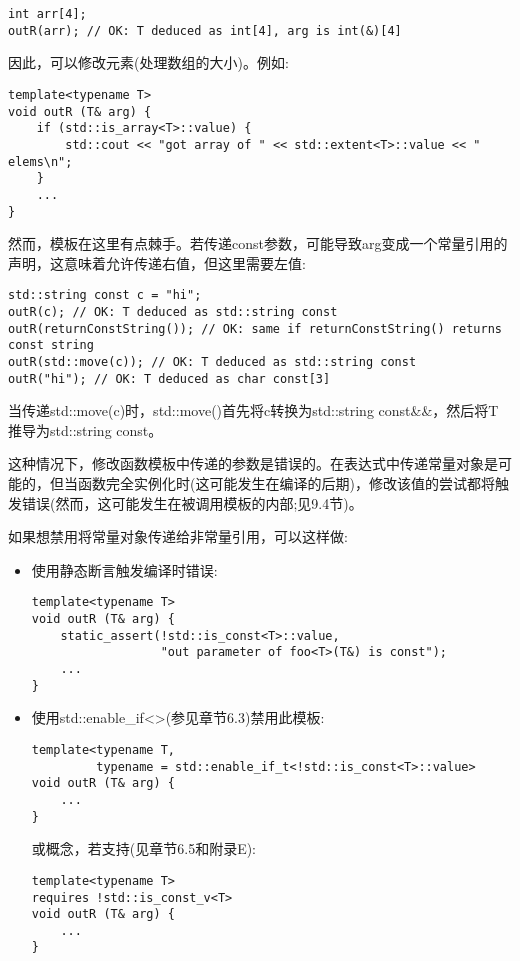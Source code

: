 \begin{lstlisting}[style=styleCXX]
int arr[4];
outR(arr); // OK: T deduced as int[4], arg is int(&)[4]
\end{lstlisting}

因此，可以修改元素(处理数组的大小)。例如:

\begin{lstlisting}[style=styleCXX]
template<typename T>
void outR (T& arg) {
	if (std::is_array<T>::value) {
		std::cout << "got array of " << std::extent<T>::value << " elems\n";
	}
	...
}
\end{lstlisting}

然而，模板在这里有点棘手。若传递const参数，可能导致arg变成一个常量引用的声明，这意味着允许传递右值，但这里需要左值:

\begin{lstlisting}[style=styleCXX]
std::string const c = "hi";
outR(c); // OK: T deduced as std::string const
outR(returnConstString()); // OK: same if returnConstString() returns const string
outR(std::move(c)); // OK: T deduced as std::string const
outR("hi"); // OK: T deduced as char const[3]
\end{lstlisting}

\begin{tcolorbox}[colback=webgreen!5!white,colframe=webgreen!75!black]
\hspace*{0.75cm}当传递std::move(c)时，std::move()首先将c转换为std::string const\&\&，然后将T推导为std::string const。
\end{tcolorbox}

这种情况下，修改函数模板中传递的参数是错误的。在表达式中传递常量对象是可能的，但当函数完全实例化时(这可能发生在编译的后期)，修改该值的尝试都将触发错误(然而，这可能发生在被调用模板的内部;见9.4节)。

如果想禁用将常量对象传递给非常量引用，可以这样做:

\begin{itemize}
\item 
使用静态断言触发编译时错误:

\begin{lstlisting}[style=styleCXX]
template<typename T>
void outR (T& arg) {
	static_assert(!std::is_const<T>::value,
				  "out parameter of foo<T>(T&) is const");
	...
}
\end{lstlisting}

\item 
使用std::enable\_if<>(参见章节6.3)禁用此模板:

\begin{lstlisting}[style=styleCXX]
template<typename T,
		 typename = std::enable_if_t<!std::is_const<T>::value>
void outR (T& arg) {
	...
}
\end{lstlisting}

或概念，若支持(见章节6.5和附录E):

\begin{lstlisting}[style=styleCXX]
template<typename T>
requires !std::is_const_v<T>
void outR (T& arg) {
	...
}
\end{lstlisting}

\end{itemize}

